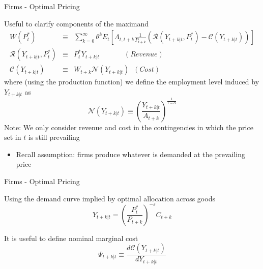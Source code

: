 \documentclass{beamer}
\begin{document}

	
\begin{frame}{Firms - Optimal Pricing}

Useful to clarify components of the maximand
\begin{eqnarray*}
W(P_{t}^{\ast}) &\equiv& \sum\limits_{k=0}^{\infty} \theta^{k} E_{t} \left[ \Lambda_{t,t+k} \frac{1}{P_{t+k}}  \left( \mathcal{R}(Y_{t+k|t},P_{t}^{\ast}) - \mathcal{C}(Y_{t+k|t}) \right) \right] \\
\mathcal{R}(Y_{t+k|t},P_{t}^{\ast}) &\equiv& P_{t}^{\ast} Y_{t+k|t} \qquad \quad \;\, (Revenue)\\
\mathcal{C}(Y_{t+k|t}) &\equiv& W_{t+k} \mathcal{N}(Y_{t+k|t}) \;\; (Cost)
\end{eqnarray*}
where (using the production function) we define the employment level induced by $Y_{t+k|t}$ as
\[
\mathcal{N}(Y_{t+k|t}) \equiv \left( \frac{Y_{t+k|t}}{A_{t+k}} \right)^{\frac{1}{1-\alpha}}
\]
Note: We only consider revenue and cost in the contingencies in which the price set in $t$ is still prevailing
\begin{itemize}
\item	Recall assumption: firms produce whatever is demanded at the prevailing price
\end{itemize}
	
\end{frame}


	
\begin{frame}{Firms - Optimal Pricing}

Using the demand curve implied by optimal allocation across goods
\[
Y_{t+k|t} = \left( \frac{P_{t}^{\ast}}{P_{t+k}} \right)^{-\varepsilon} C_{t+k}
\]

It is useful to define nominal marginal cost
\[
\Psi_{t+k|t} \equiv \frac{d \mathcal{C}(Y_{t+k|t})}{dY_{t+k|t}}
\]

	
\end{frame}


	
\end{document}

